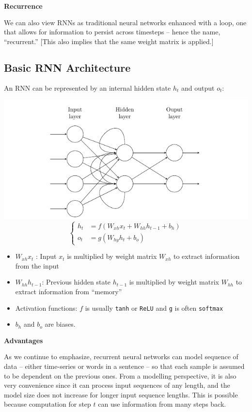 \documentclass[
]{book}
\providecommand{\tightlist}{%
  \setlength{\itemsep}{0pt}\setlength{\parskip}{0pt}}
\begin{document}
\textbf{Recurrence}

We can also view RNNs as traditional neural networks enhanced with a loop, one that allows for information to persist across timesteps -- hence the name, ``recurrent.'' {[}This also implies that the same weight matrix is applied.{]}

\hypertarget{basic-rnn-architecture}{%
\subsection{Basic RNN Architecture}\label{basic-rnn-architecture}}

An RNN can be represented by an internal hidden state \(h_t\) and output \(o_t\):

\includegraphics{Figures/RNN.png}
\[
\begin{cases}
h_{t} & =f\left(W_{xh}x_{t}+W_{hh}h_{t-1}+b_{h}\right)\\
o_{t} & =g\left(W_{hy}h_{t}+b_{o}\right)
\end{cases}
\]

\begin{itemize}
\tightlist
\item
  \(W_{xh}x_t\) : Input \(x_t\) is multiplied by weight matrix \(W_{xh}\) to extract information from the input
\item
  \(W_{hh}h_{t-1}\): Previous hidden state \(h_{t-1}\) is multiplied by weight matrix \(W_{hh}\) to extract information from ``memory''
\item
  Activation functions: \(f\) is usually \texttt{tanh} or \texttt{ReLU} and \texttt{g} is often \texttt{softmax}
\item
  \(b_h\) and \(b_o\) are biases.
\end{itemize}

\textbf{Advantages}

As we continue to emphasize, recurrent neural networks can model sequence of data -- either time-series or words in a sentence -- so that each sample is assumed to be dependent on the previous ones. From a modelling perspective, it is also very convenience since it can process input sequences of any length, and the model size does not increase for longer input sequence lengths. This is possible because computation for step \(t\) can use information from many steps back.
\end{document}
